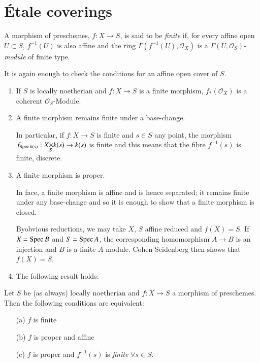 \section{\'Etale coverings}\label{chap3-sec3.5}

\begin{defi*}
A morphism of preschemes, $f:X\to S$, is said to be {\em finite} if,
for every affine open $U\subset S$, $f^{-1}(U)$ is also affine and the
ring $\Gamma(f^{-1}(U),\mathscr{O}_{X})$ is a
$\Gamma(U,\mathscr{O}_{S})$-{\em module} of finite type.
\end{defi*}

It is again enough to check the conditions for an affine open cover of
$S$.
\begin{enumerate}
\renewcommand{\labelenumi}{(\theenumi)}
\item If $S$ is locally noetherian and $f:X\to S$ is a finite
  morphism, $f_{\ast}(\mathscr{O}_{X})$ is a coherent
  $\mathscr{O}_{S}$-Module.

\item A finite morphism remains finite under a base-change.

In particular, if $f:X\to S$ is finite and $s\in S$ any point, the
morphism $f_{\Spec k(s)}:\fprod{X}{k(s)}{S}\to k(s)$ is finite and
this means that the fibre $f^{-1}(s)$ is finite, discrete.

\item A finite morphism is proper.

In face, a finite morphism is affine and is hence separated; it
remains finite under any base-change and so it is enough to show that
a finite morphism is closed.

By\pageoriginale obvious reductions, we may take $X$, $S$ affine
reduced and $\overline{f(X)}=S$. If $X=\operatorname{Spec} B$ and $S=\operatorname{Spec} A$, the
corresponding homomorphism $A\to B$ is an injection and $B$ is a
finite $A$-module. Cohen-Seidenberg then shows that $f(X)=S$.

\item The following result holds:
\end{enumerate}

\begin{lemma}[Chevalley]\label{chap3-lem3.5.1}
Let $S$ be (as always) locally noetherian and $f:X\to S$ a morphism of
preschemes. Then the following conditions are equivalent:
\begin{itemize}
\item[\rm(a)] $f$ is finite

\item[\rm(b)] $f$ is proper and affine

\item[\rm(c)] $f$ is proper and $f^{-1}(s)$ is {\em finite} $\forall s\in
  S$.
\end{itemize}
\end{lemma}

